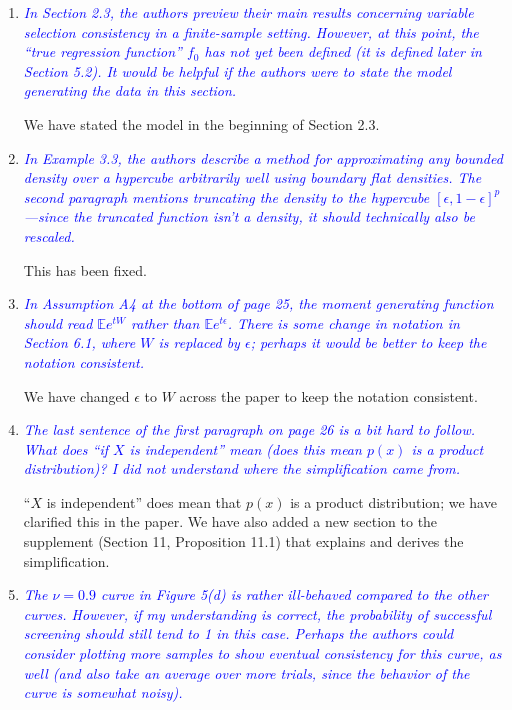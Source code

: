 \documentclass[pdftex,12pt]{article}
\def\E{{\mathbb E}}
\def\rc#1{{\it\textcolor{blue}{#1}}\smallskip}
\begin{document}
\begin{enumerate}
\item \rc{In Section 2.3, the authors preview their main results concerning variable selection consistency in a finite-sample setting. However, at this point, the “true regression function” $f_0$ has not yet been defined (it is defined later in Section 5.2). It would be helpful if the authors were to state the model generating the data in this section.}

We have stated the model in the beginning of Section 2.3.

\item \rc{In Example 3.3, the authors describe a method for approximating any bounded density over a hypercube arbitrarily well using boundary flat densities. The second paragraph mentions truncating the density to the hypercube $[\epsilon, 1−\epsilon]^p$—since the truncated function isn’t a density, it should technically also be rescaled.}

This has been fixed. 

\item \rc{In Assumption A4 at the bottom of page 25, the moment generating function should read $\E e^{tW}$ rather than $\E e^{t \epsilon}$. There is some change in notation in Section 6.1, where $W$ is replaced by $\epsilon$; perhaps it would be better to keep the notation consistent.}

We have changed $\epsilon$ to $W$ across the paper to keep the notation consistent. 

\item \rc{The last sentence of the first paragraph on page 26 is a bit hard to follow. What does “if $X$ is independent” mean (does this mean $p(x)$ is a product distribution)? I did not understand where the simplification came from.}

``$X$ is independent'' does mean that $p(x)$ is a product distribution; we have clarified this in the paper. We have also added a new section to the supplement (Section 11, Proposition 11.1) that explains and derives the simplification. 

\item \rc{The $\nu = 0.9$ curve in Figure 5(d) is rather ill-behaved compared to the other curves. However, if my understanding is correct, the probability of successful screening should still tend to 1 in this case. Perhaps the authors could consider plotting more samples to show eventual consistency for this curve, as well (and also take an average over more trials, since the behavior of the curve is somewhat noisy).}


\end{enumerate}
\end{document}
